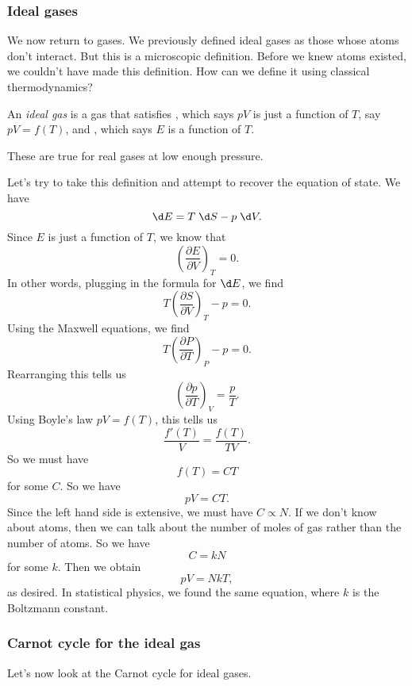 \documentclass[a4paper]{article}
\begin{document}
\subsubsection*{Ideal gases}
We now return to gases. We previously defined ideal gases as those whose atoms don't interact. But this is a microscopic definition. Before we knew atoms existed, we couldn't have made this definition. How can we define it using classical thermodynamics?

\begin{defi}
  An \emph{ideal gas} is a gas that satisfies , which says $pV$ is just a function of $T$, say $pV = f(T)$, and , which says $E$ is a function of $T$.
\end{defi}
These are true for real gases at low enough pressure.

Let's try to take this definition and attempt to recover the equation of state. We have
\[
  \d E = T\;\d S - p \;\d V.
\]
Since $E$ is just a function of $T$, we know that
\[
  \left(\frac{\partial E}{\partial V}\right)_T = 0.
\]
In other words, plugging in the formula for $\d E$, we find
\[
  T\left(\frac{\partial S}{\partial V}\right)_T - p = 0.
\]
Using the Maxwell equations, we find
\[
  T\left(\frac{\partial P}{\partial T}\right)_P - p = 0.
\]
Rearranging this tells us
\[
  \left(\frac{\partial p}{\partial T}\right)_V = \frac{p}{T}.
\]
Using Boyle's law $pV = f(T)$, this tells us
\[
  \frac{f'(T)}{V} = \frac{f(T)}{TV}.
\]
So we must have
\[
  f(T) = CT
\]
for some $C$. So we have
\[
  pV = CT.
\]
Since the left hand side is extensive, we must have $C \propto N$. If we don't know about atoms, then we can talk about the number of moles of gas rather than the number of atoms. So we have
\[
  C = kN
\]
for some $k$. Then we obtain
\[
  pV = NkT,
\]
as desired. In statistical physics, we found the same equation, where $k$ is the Boltzmann constant.

\subsubsection*{Carnot cycle for the ideal gas}
Let's now look at the Carnot cycle for ideal gases.
\end{document}
